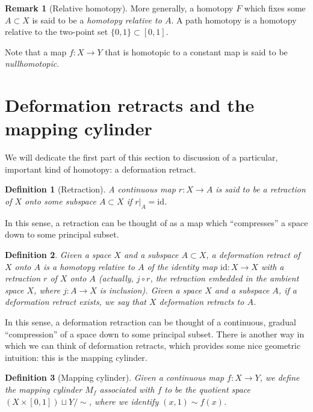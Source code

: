 \documentclass[10pt, oneside]{amsart}
\newtheorem{definition}{Definition}
\theoremstyle{definition}
\newtheorem{remark}{Remark}
\begin{document}
\begin{remark}[Relative homotopy]
  More generally, a homotopy $F$ which fixes some $A \subset X$ is said to be a \emph{homotopy relative to $A$}. A path homotopy is a homotopy relative to
  the two-point set $\{0, 1\} \subset [0, 1]$.
\end{remark}

\noindent Note that a map $f : X \rightarrow Y$ that is homotopic to a constant map is said to be \emph{nullhomotopic}.

\section{Deformation retracts and the mapping cylinder}

\noindent We will dedicate the first part of this section to discussion of a particular, important kind of homotopy: a deformation retract.

\begin{definition}[Retraction]
  A continuous map $r : X \rightarrow A$ is said to be a \emph{retraction} of $X$ onto some subspace $A \subset X$ if $r|_{A} = \text{id}$.
\end{definition}

\noindent In this sense, a retraction can be thought of as a map which ``compresses'' a space down to some principal subset.

\begin{definition}
  Given a space $X$ and a subspace $A \subset X$, a deformation retract of $X$ onto $A$ is a homotopy relative to $A$ of the identity map $\text{id} : X \rightarrow X$
  with a retraction $r$ of $X$ onto $A$ (actually, $j \circ r$, the retraction embedded in the ambient space $X$, where $j : A \rightarrow X$ is inclusion).
  Given a space $X$ and a subspace $A$, if a deformation retract exists, we say that $X$ deformation retracts to $A$.
\end{definition}

\noindent In this sense, a deformation retraction can be thought of a continuous, gradual ``compression'' of a space down to some principal subset.
There is another way in which we can think of deformation retracts, which provides some nice geometric intuition: this is the mapping cylinder.

\begin{definition}[Mapping cylinder]
  Given a continuous map $f : X \rightarrow Y$, we define the mapping cylinder $M_f$ associated with $f$ to be the quotient space
  $(X \times [0, 1]) \sqcup Y / \sim$, where we identify $(x, 1) \sim f(x)$.
\end{definition}
\end{document}
